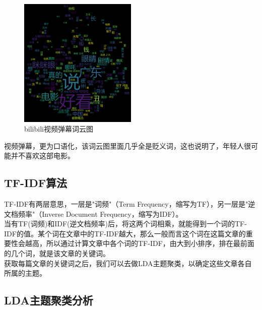 \documentclass[12pt,a4paper,utf8]{article}
\begin{document}
\begin{figure}[H]
    \centering
    \includegraphics[width=0.5\textwidth]{images/bilibili.png}  
    \caption{bilibili视频弹幕词云图} 
\end{figure}  
视频弹幕，更为口语化，该词云图里面几乎全是贬义词，这也说明了，年轻人很可能并不喜欢这部电影。


\subsection{TF-IDF算法}
TF-IDF有两层意思，一层是"词频"（Term Frequency，缩写为TF），另一层是"逆文档频率"（Inverse Document Frequency，缩写为IDF）。 \\ 

当有TF(词频)和IDF(逆文档频率)后，将这两个词相乘，就能得到一个词的TF-IDF的值。某个词在文章中的TF-IDF越大，那么一般而言这个词在这篇文章的重要性会越高，所以通过计算文章中各个词的TF-IDF，由大到小排序，排在最前面的几个词，就是该文章的关键词。 \\

获取每篇文章的关键词之后，我们可以去做LDA主题聚类，以确定这些文章各自所属的主题。

\subsection{LDA主题聚类分析}
\end{document}
